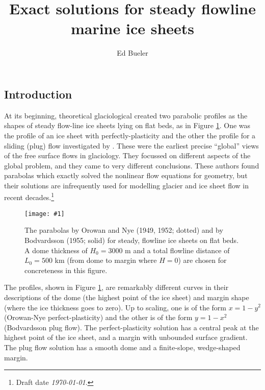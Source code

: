 \documentclass[twocolumn,letterpaper]{igs}
\newcommand{\onecol}[1]{\texttt{[image: \#1]}}
\begin{document}
\title{Exact solutions for steady flowline marine ice sheets}


\author{Ed Bueler}



\maketitle

\subsection*{Introduction}  At its beginning, theoretical glaciological created two parabolic profiles as the shapes of steady flow-line ice sheets lying on flat beds, as in Figure \ref{fig:twoparabolas}.  One was the profile of an ice sheet with perfectly-plasticity \citep{Orowan,Nye52plastic} and the other the profile for a sliding (plug) flow investigated by \cite{Bodvardsson}.  These were the earliest precise ``global'' views of the free surface flows in glaciology.  They focussed on different aspects of the global problem, and they came to very different conclusions.  These authors found parabolas which exactly solved the nonlinear flow equations for geometry, but their solutions are infrequently used for modelling glacier and ice sheet flow in recent decades.\footnote{Draft date \emph{\today}.}

\begin{figure}[ht]
\onecol{twoparabolas}
\caption{The parabolas by Orowan and Nye (1949, 1952; dotted) and by Bodvardsson (1955; solid) for steady, flowline ice sheets on flat beds.  A dome thickness of $H_0=3000$ m and a total flowline distance of $L_0=500$ km (from dome to margin where $H=0$) are chosen for concreteness in this figure.} \label{fig:twoparabolas}
\end{figure}

The profiles, shown in Figure \ref{fig:twoparabolas}, are remarkably different curves in their descriptions of the dome (the highest point of the ice sheet) and margin shape (where the ice thickness goes to zero).   Up to scaling, one is of the form $x=1-y^2$ (Orowan-Nye perfect-plasticity)\nocite{Nye52plastic,Orowan} and the other is of the form $y=1-x^2$ (Bodvardsson plug flow).  The perfect-plasticity solution has a central peak at the highest point of the ice sheet, and a margin with unbounded surface gradient.  The plug flow solution has a smooth dome and a finite-slope, wedge-shaped margin.
\end{document}
